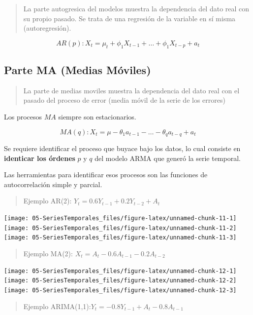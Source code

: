 \documentclass[]{book}
\begin{document}
\begin{quote}
La parte autogresica del modelos muestra la dependencia del dato real con su propio pasado. Se trata de una regresión de la variable en sí misma (autoregresión).
\end{quote}

\[AR(p): X_t= \mu_t + \phi_1X_{t-1} + \ldots + \phi_1X_{t-p} + a_t\]

\hypertarget{parte-ma-medias-moviles}{%
\subsection{Parte MA (Medias Móviles)}\label{parte-ma-medias-moviles}}

\begin{quote}
La parte de medias moviles muestra la dependencia del dato real con el pasado del proceso de error (media móvil de la serie de los errores)
\end{quote}

Los procesos \(MA\) siempre son estacionarios.

\[MA(q): X_t= \mu - \theta_1 a_{t-1} - \ldots - \theta_q a_{t-q} + a_t\]

Se requiere identificar el proceso que buyace bajo los datos, lo cual consiste en \textbf{identicar los órdenes} \(p\) y \(q\) del modelo ARMA que generó la serie temporal.

Las herramientas para identificar esos procesos son las funciones de autocorrelación simple y parcial.

\begin{quote}
Ejemplo AR(2): \(Y_t = 0.6Y_{t-1}+0.2Y_{t-2}+A_t\)
\end{quote}

\texttt{[image: 05-SeriesTemporales\_files/figure-latex/unnamed-chunk-11-1]}
\texttt{[image: 05-SeriesTemporales\_files/figure-latex/unnamed-chunk-11-2]}
\texttt{[image: 05-SeriesTemporales\_files/figure-latex/unnamed-chunk-11-3]}

\begin{quote}
Ejemplo MA(2): \(X_t=A_t-0.6A_{t-1}-0.2A_{t-2}\)
\end{quote}

\texttt{[image: 05-SeriesTemporales\_files/figure-latex/unnamed-chunk-12-1]}
\texttt{[image: 05-SeriesTemporales\_files/figure-latex/unnamed-chunk-12-2]}
\texttt{[image: 05-SeriesTemporales\_files/figure-latex/unnamed-chunk-12-3]}

\begin{quote}
Ejemplo ARIMA(1,1):\(Y_t = -0.8 Y_{t-1} + A_t -0.8A_{t-1}\)
\end{quote}
\end{document}
